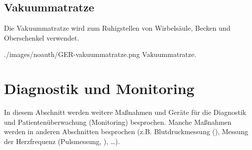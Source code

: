 \subsection{Vakuummatratze}
\label{topic:vakuummatratze-beschreibung}

{
Die Vakuummatratze wird zum Ruhigstellen von Wirbelsäule, Becken und
Oberschenkel verwendet. }{

}
{./images/noauth/GER-vakuummatratze.png}
{Vakuummatratze.}
{}


% 
% 
% 
% 
% 
% 
% 
% 

\section{Diagnostik und Monitoring}

In diesem Abschnitt werden weitere Maßnahmen und Geräte für die Diagnostik und
Patientenüberwachung (Monitoring) besprochen. Manche Maßnahmen werden in anderen
Abschnitten besprochen (z.B. Blutdruckmessung
(), Messung der Herzfrequenz (Pulsmessung,
), \ldots). 

